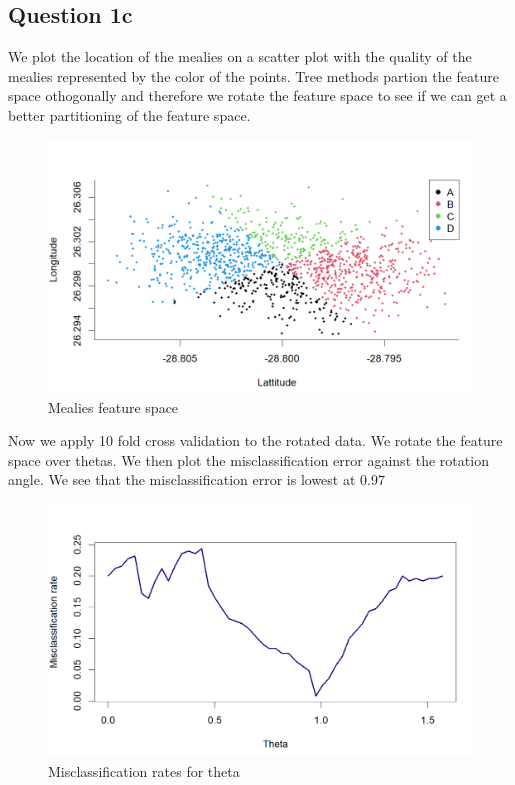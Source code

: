 \documentclass[
]{article}
\begin{document}
\hypertarget{question-1c}{%
\subsection{Question 1c}\label{question-1c}}

We plot the location of the mealies on a scatter plot with the quality
of the mealies represented by the color of the points. Tree methods
partion the feature space othogonally and therefore we rotate the
feature space to see if we can get a better partitioning of the feature
space.

\begin{figure}
\centering
\includegraphics[width=4.84375in,height=\textheight]{feature_space_mealies.png}
\caption{Mealies feature space}
\end{figure}

Now we apply 10 fold cross validation to the rotated data. We rotate the
feature space over thetas. We then plot the misclassification error
against the rotation angle. We see that the misclassification error is
lowest at 0.97

\begin{figure}
\centering
\includegraphics[width=4.41667in,height=\textheight]{misclass_theta_mealies.png}
\caption{Misclassification rates for theta}
\end{figure}
\end{document}
